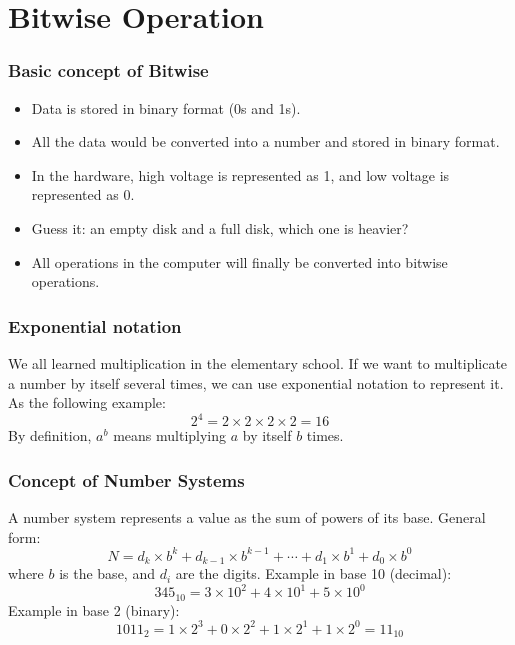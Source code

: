 \documentclass[xcolor=dvipsnames]{beamer}
\begin{document}
    \section{Bitwise Operation}
    \begin{frame}
        \frametitle{Basic concept of Bitwise}
        \begin{itemize}
            \item Data is stored in binary format (0s and 1s).
            \item All the data would be converted into a number and stored in binary format.
            \item In the hardware, high voltage is represented as 1, and low voltage is represented as 0.
            \item Guess it: an empty disk and a full disk, which one is heavier?
            \item All operations in the computer will finally be converted into bitwise operations.
        \end{itemize}
    \end{frame}

    \begin{frame}
        \frametitle{Exponential notation}
        We all learned multiplication in the elementary school. If we want to multiplicate a number by itself several times, we can use exponential notation to represent it.\\
        As the following example:
        $$2^4 = 2 \times 2 \times 2 \times 2 = 16$$
        By definition, $a^b$ means multiplying $a$ by itself $b$ times.\\
    \end{frame}

    \begin{frame}
        \frametitle{Concept of Number Systems}
        A number system represents a value as the sum of powers of its base.
        General form:
        $$
        N = d_k \times b^k + d_{k-1} \times b^{k-1} + \cdots + d_1 \times b^1 + d_0 \times b^0
        $$
        where $b$ is the base, and $d_i$ are the digits.
        Example in base 10 (decimal):
        $$
        345_{10} = 3 \times 10^2 + 4 \times 10^1 + 5 \times 10^0
        $$
        Example in base 2 (binary):
        $$
        1011_2 = 1 \times 2^3 + 0 \times 2^2 + 1 \times 2^1 + 1 \times 2^0 = 11_{10}
        $$
    \end{frame}
\end{document}
